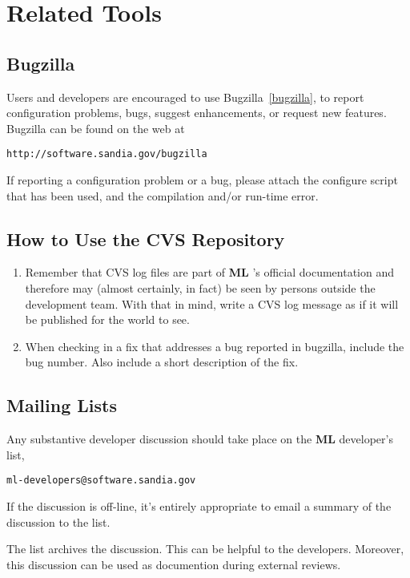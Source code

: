 \documentclass[10pt,letter,relax]{SANDreport}
\newcommand{\ML}     {{\bf ML }}
\begin{document}

\section{Related Tools}

\subsection{Bugzilla}

Users and developers are encouraged to use Bugzilla~\ref{bugzilla}, to
report configuration problems, bugs, suggest enhancements, or request
new features. Bugzilla can be found on the web at 
\begin{verbatim}
http://software.sandia.gov/bugzilla
\end{verbatim}
If reporting a configuration problem or a bug, please attach the
configure script that has been used, and the compilation and/or run-time
error.

\subsection{How to Use the CVS Repository}
\begin{enumerate}
\item Remember that CVS log files are part of \ML's official
  documentation and therefore may (almost certainly, in fact) be seen by
  persons outside the development team.  With that in mind, write a CVS
  log message as if it will be published for the world to see.
\item When checking in a fix that addresses a bug reported in bugzilla,
  include the bug number.  Also include a short description of the fix.
\end{enumerate}

\subsection{Mailing Lists}

Any substantive developer discussion should take place on the \ML
developer's list, 
\begin{verbatim}
ml-developers@software.sandia.gov
\end{verbatim}
If the discussion is off-line, it's entirely appropriate to email a
summary of the discussion to the list.

The list archives the discussion.  This can be helpful to the
developers.  Moreover, this discussion can be used as documention during
external reviews.
\end{document}
